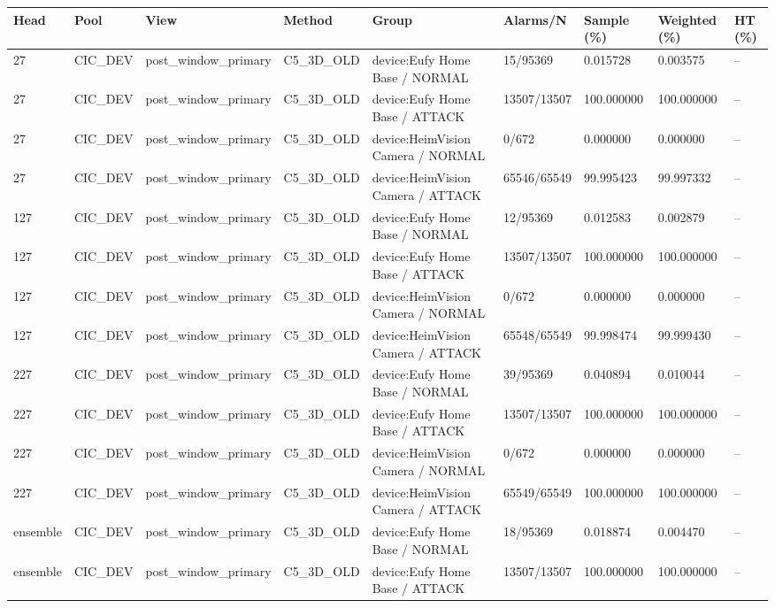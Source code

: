 \begin{tabular}{lllllllll}
\hline
Head & Pool & View & Method & Group & Alarms/N & Sample (\%) & Weighted (\%) & HT (\%) \\
\hline
27 & CIC\_DEV & post\_window\_primary & C5\_3D\_OLD & device:Eufy Home Base / NORMAL & 15/95369 & 0.015728 & 0.003575 & -- \\
27 & CIC\_DEV & post\_window\_primary & C5\_3D\_OLD & device:Eufy Home Base / ATTACK & 13507/13507 & 100.000000 & 100.000000 & -- \\
27 & CIC\_DEV & post\_window\_primary & C5\_3D\_OLD & device:HeimVision Camera / NORMAL & 0/672 & 0.000000 & 0.000000 & -- \\
27 & CIC\_DEV & post\_window\_primary & C5\_3D\_OLD & device:HeimVision Camera / ATTACK & 65546/65549 & 99.995423 & 99.997332 & -- \\
127 & CIC\_DEV & post\_window\_primary & C5\_3D\_OLD & device:Eufy Home Base / NORMAL & 12/95369 & 0.012583 & 0.002879 & -- \\
127 & CIC\_DEV & post\_window\_primary & C5\_3D\_OLD & device:Eufy Home Base / ATTACK & 13507/13507 & 100.000000 & 100.000000 & -- \\
127 & CIC\_DEV & post\_window\_primary & C5\_3D\_OLD & device:HeimVision Camera / NORMAL & 0/672 & 0.000000 & 0.000000 & -- \\
127 & CIC\_DEV & post\_window\_primary & C5\_3D\_OLD & device:HeimVision Camera / ATTACK & 65548/65549 & 99.998474 & 99.999430 & -- \\
227 & CIC\_DEV & post\_window\_primary & C5\_3D\_OLD & device:Eufy Home Base / NORMAL & 39/95369 & 0.040894 & 0.010044 & -- \\
227 & CIC\_DEV & post\_window\_primary & C5\_3D\_OLD & device:Eufy Home Base / ATTACK & 13507/13507 & 100.000000 & 100.000000 & -- \\
227 & CIC\_DEV & post\_window\_primary & C5\_3D\_OLD & device:HeimVision Camera / NORMAL & 0/672 & 0.000000 & 0.000000 & -- \\
227 & CIC\_DEV & post\_window\_primary & C5\_3D\_OLD & device:HeimVision Camera / ATTACK & 65549/65549 & 100.000000 & 100.000000 & -- \\
ensemble & CIC\_DEV & post\_window\_primary & C5\_3D\_OLD & device:Eufy Home Base / NORMAL & 18/95369 & 0.018874 & 0.004470 & -- \\
ensemble & CIC\_DEV & post\_window\_primary & C5\_3D\_OLD & device:Eufy Home Base / ATTACK & 13507/13507 & 100.000000 & 100.000000 & -- \\

\end{tabular}
